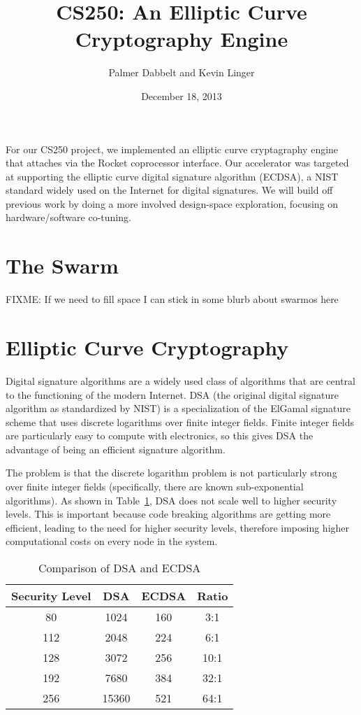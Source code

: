 \documentclass[twocolumn]{article}
\title{CS250: An Elliptic Curve Cryptography Engine}
\author{Palmer Dabbelt and Kevin Linger}
\date{December 18, 2013}
\begin{document}
\maketitle

For our CS250 project, we implemented an elliptic curve cryptagraphy
engine that attaches via the Rocket coprocessor interface.  Our
accelerator was targeted at supporting the elliptic curve digital
signature algorithm (ECDSA), a NIST standard widely used on the
Internet for digital signatures.  We will build off previous work by
doing a more involved design-space exploration, focusing on
hardware/software co-tuning.

\section{The Swarm}

FIXME: If we need to fill space I can stick in some blurb about
swarmos here

\section{Elliptic Curve Cryptography}

Digital signature algorithms\cite{fips-186-3} are a widely used class
of algorithms that are central to the functioning of the modern
Internet.  DSA\cite{us-dsa} (the original digital signature algorithm
as standardized by NIST) is a specialization of the ElGamal signature
scheme\cite{elgamal-sig} that uses discrete logarithms over finite
integer fields.  Finite integer fields are particularly easy to
compute with electronics, so this gives DSA the advantage of being an
efficient signature algorithm.

The problem is that the discrete logarithm problem is not particularly
strong over finite integer fields (specifically, there are known
sub-exponential algorithms\cite{adleman-subexp}).  As shown in
Table~\ref{key-sizes}, DSA does not scale well to higher security
levels.  This is important because code breaking algorithms are
getting more efficient, leading to the need for higher security
levels, therefore imposing higher computational costs on every node in
the system. 

\begin{table}[h]
  \begin{center}
    \begin{tabular}{cccc}
      Security Level & DSA & ECDSA & Ratio \\
      \hline
      80 & 1024 & 160 & 3:1 \\
      112 & 2048 & 224 & 6:1 \\
      128 & 3072 & 256 & 10:1 \\
      192 & 7680 & 384 & 32:1 \\
      256 & 15360 & 521 & 64:1 \\
    \end{tabular}
  \end{center}

  \caption{Comparison of DSA and ECDSA\cite{nsa-case_for_ecc}
    \label{key-sizes}}
\end{table}
\end{document}
